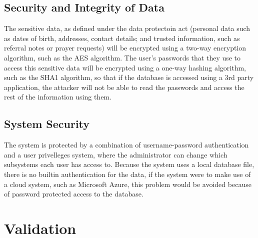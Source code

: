 \subsection{Security and Integrity of Data}
	The sensitive data, as defined under the data protectoin act (personal data such as dates of birth, addresses, contact details; and
	trusted information, such as referral notes or prayer requests) will be encrypted using a two-way encryption algorithm, such as the
	AES algorithm.
	The user's passwords that they use to access this sensitive data will be encrypted using a one-way hashing algorithm, such as the SHA1
	algorithm, so that if the database is accessed using a 3rd party application, the attacker will not be able to read the passwords and
	access the rest of the information using them.


\subsection{System Security}
	The system is protected by a combination of username-password authentication and a user privelleges system, where the administrator can
	change which subsystems each user has access to. Because the system uses a local database file, there is no builtin authentication for
	the data, if the system were to make use of a cloud system, such as Microsoft Azure, this problem would be avoided because of password
	protected  access to the database.

\section{Validation}

